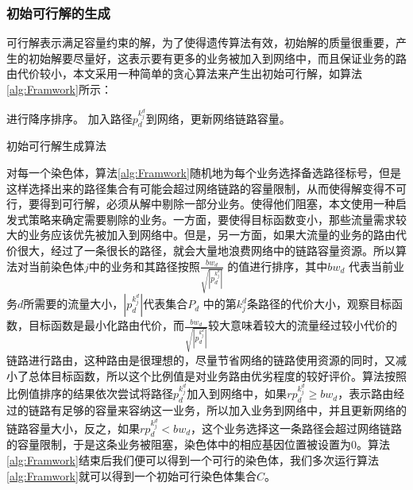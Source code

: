 \subsubsection{初始可行解的生成}
可行解表示满足容量约束的解，为了使得遗传算法有效，初始解的质量很重要，产生的初始解要尽量好，这表示要有更多的业务被加入到网络中，而且保证业务的路由代价较小，本文采用一种简单的贪心算法来产生出初始可行解，如算法\ref{alg:Framwork}所示：
\begin{algorithm}[htb]
\begin{algorithmic}[1]
\EndFor
{}进行降序排序。
\State 加入路径$p^{k^d_j}_d$到网络，更新网络链路容量。
\Else
{}
\EndIf
\EndFor
\EndFor
\end{algorithmic}
\caption{初始可行解生成算法}
\label{alg:Framwork}
\end{algorithm}

对每一个染色体，算法\ref{alg:Framwork}随机地为每个业务选择备选路径标号，但是这样选择出来的路径集合有可能会超过网络链路的容量限制，从而使得解变得不可行，要得到可行解，必须从解中剔除一部分业务。使得他们阻塞，本文使用一种启发式策略来确定需要剔除的业务。一方面，要使得目标函数变小，那些流量需求较大的业务应该优先被加入到网络中。但是，另一方面，如果大流量的业务的路由代价很大，经过了一条很长的路径，就会大量地浪费网络中的链路容量资源。所以算法对当前染色体$j$中的业务和其路径按照$\frac{bw_d}{\sqrt{|p^{k^d_j}_d|}}$ 的值进行排序，其中${bw_d}$ 代表当前业务$d$所需要的流量大小，$|p^{k^d_j}_d|$代表集合$P_d$ 中的第${k^d_j}$条路径的代价大小，观察目标函数，目标函数是最小化路由代价，而$\frac{bw_d}{\sqrt{|p^{k^d_j}_d|}}$较大意味着较大的流量经过较小代价的链路进行路由，这种路由是很理想的，尽量节省网络的链路使用资源的同时，又减小了总体目标函数，所以这个比例值是对业务路由优劣程度的较好评价。算法按照比例值排序的结果依次尝试将路径$p^{k^d_j}_d$加入到网络中，如果$rp^{k^d_j}_d \ge bw_d$，表示路由经过的链路有足够的容量来容纳这一业务，所以加入业务到网络中，并且更新网络的链路容量大小，反之，如果$rp^{k^d_j}_d<bw_d$，这个业务选择这一条路径会超过网络链路的容量限制，于是这条业务被阻塞，染色体中的相应基因位置被设置为0。算法\ref{alg:Framwork}结束后我们便可以得到一个可行的染色体，我们多次运行算法\ref{alg:Framwork}就可以得到一个初始可行染色体集合$C$。

